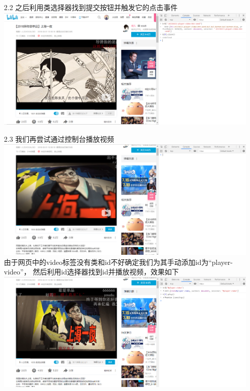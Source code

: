 \documentclass[UTF8]{ctexart}
\begin{document}
\begin{enumerate}
\begin{enumerate}
            \item[2.2] 
            之后利用类选择器找到提交按钮并触发它的点击事件\\
            \includegraphics[scale=0.3]{06-27_5.png}
            \item[2.3] 
            我们再尝试通过控制台播放视频\\
            \includegraphics[scale=0.3]{06-27_6.png}
            由于网页中的video标签没有类和id不好确定我们为其手动添加id为``player-video''，
            然后利用id选择器找到id并播放视频，效果如下\\
            \includegraphics[scale=0.3]{06-27_7.png}  
        \end{enumerate} 
    \end{enumerate}
\end{document}
